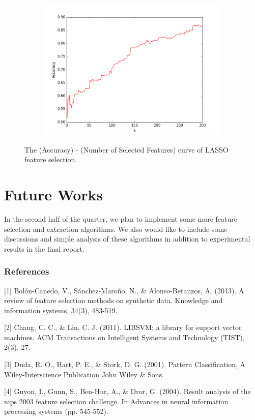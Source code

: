 \documentclass{article} %
\begin{document}
\begin{enumerate}
\begin{figure}[H]
\begin{subfigure}{.5\textwidth}
          \includegraphics[width=\linewidth]{lasso.png}
          \label{fig6}
          \end{subfigure}
          \caption{The (Accuracy) - (Number of Selected Features) curve of LASSO feature selection.}
          \label{fig6-6}
          \end{figure}
	\end{enumerate}
	\section{Future Works}
	In the second half of the quarter, we plan to implement some more feature selection and extraction algorithms. We also would like to include some discussions and simple analysis of these algorithms in addition to experimental results in the final report. 
	\subsubsection*{References}
	
	\small{
        [1] Bolón-Canedo, V., Sánchez-Maroño, N., \& Alonso-Betanzos, A. (2013). A review of feature selection methods on synthetic data. Knowledge and information systems, 34(3), 483-519.
            
		[2] Chang, C. C., \& Lin, C. J. (2011). LIBSVM: a library for support vector machines. ACM Transactions on Intelligent Systems and Technology (TIST), 2(3), 27.
		
		[3] Duda, R. O., Hart, P. E., \& Stork, D. G. (2001). Pattern Classification, A Wiley-Interscience Publication John Wiley \& Sons.
        
        [4] Guyon, I., Gunn, S., Ben-Hur, A., \& Dror, G. (2004). Result analysis of the nips 2003 feature selection challenge. In Advances in neural information processing systems (pp. 545-552).
        
	}
	
\end{document}
